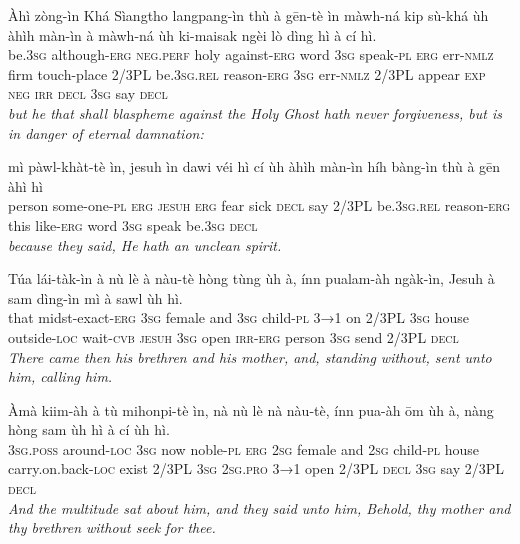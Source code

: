 \documentclass[11pt,a4paper]{article}
\begin{document}
\begin{exe}
\gll Àhì zòng-ìn Khá Sìangtho langpang-ìn thù à gēn-tè ìn màwh-ná kip sù-khá ùh àhìh màn-ìn à màwh-ná ùh ki-maisak ngèi lò dìng hì à cí hì. \\
     be.\textsc{3sg} although-\textsc{erg} \textsc{neg}.\textsc{perf} holy against-\textsc{erg} word \textsc{3sg} speak-\textsc{pl} \textsc{erg} err-\textsc{nmlz} firm touch-place 2/3PL be.\textsc{3sg}.\textsc{rel} reason-\textsc{erg} \textsc{3sg} err-\textsc{nmlz} 2/3PL appear \textsc{exp} \textsc{neg} \textsc{irr} \textsc{decl} \textsc{3sg} say \textsc{decl} \\
\glt \textcolor{kjvcolor}{\textit{but he that shall blaspheme against the Holy Ghost hath never forgiveness, but is in danger of eternal damnation:}}

\gll mì pàwl-khàt-tè ìn, jesuh ìn dawi véi hì cí ùh àhìh màn-ìn híh bàng-ìn thù à gēn àhì hì \\
     person some-one-\textsc{pl} \textsc{erg} \textsc{jesuh} \textsc{erg} fear sick \textsc{decl} say 2/3PL be.\textsc{3sg}.\textsc{rel} reason-\textsc{erg} this like-\textsc{erg} word \textsc{3sg} speak be.\textsc{3sg} \textsc{decl} \\
\glt \textcolor{kjvcolor}{\textit{because they said, He hath an unclean spirit.}}

\gll Túa lái-tàk-ìn à nù lè à nàu-tè hòng tùng ùh à, ínn pualam-àh ngàk-ìn, Jesuh à sam dìng-ìn mì à sawl ùh hì. \\
     that midst-exact-\textsc{erg} \textsc{3sg} female and \textsc{3sg} child-\textsc{pl} \textsc{3→1} on 2/3PL \textsc{3sg} house outside-\textsc{loc} wait-\textsc{cvb} \textsc{jesuh} \textsc{3sg} open \textsc{irr}-\textsc{erg} person \textsc{3sg} send 2/3PL \textsc{decl} \\
\glt \textcolor{kjvcolor}{\textit{There came then his brethren and his mother, and, standing without, sent unto him, calling him.}}

\gll Àmà kiim-àh à tù mihonpi-tè ìn, nà nù lè nà nàu-tè, ínn pua-àh ōm ùh à, nàng hòng sam ùh hì à cí ùh hì. \\
     \textsc{3sg}.\textsc{poss} around-\textsc{loc} \textsc{3sg} now noble-\textsc{pl} \textsc{erg} \textsc{2sg} female and \textsc{2sg} child-\textsc{pl} house carry.on.back-\textsc{loc} exist 2/3PL \textsc{3sg} \textsc{2sg}.\textsc{pro} \textsc{3→1} open 2/3PL \textsc{decl} \textsc{3sg} say 2/3PL \textsc{decl} \\
\glt \textcolor{kjvcolor}{\textit{And the multitude sat about him, and they said unto him, Behold, thy mother and thy brethren without seek for thee.}}


\end{exe}
\end{document}
